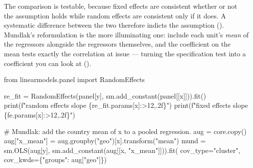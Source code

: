 \documentclass[
  letterpaper,
  10pt,
  twoside,
  openright,
  numbers=noenddot,
  chapterprefix=true]{scrbook}
\newenvironment{Shaded}{}{}
\newcommand{\BuiltInTok}[1]{\textcolor[rgb]{0.84,0.23,0.29}{#1}}
\newcommand{\CommentTok}[1]{\textcolor[rgb]{0.42,0.45,0.49}{#1}}
\newcommand{\ImportTok}[1]{\textcolor[rgb]{0.01,0.18,0.38}{#1}}
\newcommand{\NormalTok}[1]{\textcolor[rgb]{0.14,0.16,0.18}{#1}}
\newcommand{\OperatorTok}[1]{\textcolor[rgb]{0.14,0.16,0.18}{#1}}
\newcommand{\SpecialCharTok}[1]{\textcolor[rgb]{0.00,0.36,0.77}{#1}}
\newcommand{\SpecialStringTok}[1]{\textcolor[rgb]{0.01,0.18,0.38}{#1}}
\newcommand{\StringTok}[1]{\textcolor[rgb]{0.01,0.18,0.38}{#1}}
\begin{document}
The comparison is testable, because fixed effects are consistent whether
or not the assumption holds while random effects are consistent only if
it does. A systematic difference between the two therefore indicts the
assumption (). Mundlak's
reformulation is the more illuminating one: include each unit's
\emph{mean} of the regressors alongside the regressors themselves, and
the coefficient on the mean tests exactly the correlation at issue ---
turning the specification test into a coefficient you can look at
().

\label{check-mundlak}
\begin{Shaded}
\begin{Highlighting}[]
\ImportTok{from}\NormalTok{ linearmodels.panel }\ImportTok{import}\NormalTok{ RandomEffects}

\NormalTok{re\_fit }\OperatorTok{=}\NormalTok{ RandomEffects(panel[y], sm.add\_constant(panel[[x]])).fit()}
\BuiltInTok{print}\NormalTok{(}\SpecialStringTok{f"random effects slope   }\SpecialCharTok{\{}\NormalTok{re\_fit}\SpecialCharTok{.}\NormalTok{params[x]}\SpecialCharTok{:\textgreater{}12,.2f\}}\SpecialStringTok{"}\NormalTok{)}
\BuiltInTok{print}\NormalTok{(}\SpecialStringTok{f"fixed effects slope    }\SpecialCharTok{\{}\NormalTok{fe}\SpecialCharTok{.}\NormalTok{params[x]}\SpecialCharTok{:\textgreater{}12,.2f\}}\SpecialStringTok{"}\NormalTok{)}

\CommentTok{\# Mundlak: add the country mean of x to a pooled regression.}
\NormalTok{aug }\OperatorTok{=}\NormalTok{ core.copy()}
\NormalTok{aug[}\StringTok{"x\_mean"}\NormalTok{] }\OperatorTok{=}\NormalTok{ aug.groupby(}\StringTok{"geo"}\NormalTok{)[x].transform(}\StringTok{"mean"}\NormalTok{)}
\NormalTok{mund }\OperatorTok{=}\NormalTok{ sm.OLS(aug[y], sm.add\_constant(aug[[x, }\StringTok{"x\_mean"}\NormalTok{]])).fit(}
\NormalTok{    cov\_type}\OperatorTok{=}\StringTok{"cluster"}\NormalTok{, cov\_kwds}\OperatorTok{=}\NormalTok{\{}\StringTok{"groups"}\NormalTok{: aug[}\StringTok{"geo"}\NormalTok{]\})}


\end{Highlighting}
\end{Shaded}
\end{document}
